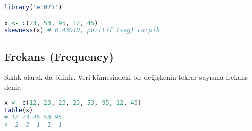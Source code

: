 \begin{lstlisting}[language=R]
library('e1071')

x <- c(23, 53, 95, 12, 45)
skewness(x) # 0.43010, pozitif (sag) carpik
\end{lstlisting}

\subsection{Frekans (Frequency)}
Sıklık olarak da bilinir. Veri kümesindeki bir değişkenin tekrar sayısına frekans denir.

\begin{lstlisting}[language=R]
x <- c(12, 23, 23, 23, 53, 95, 12, 45)
table(x)
# 12 23 45 53 95 
#  2  3  1  1  1
\end{lstlisting}

\newpage